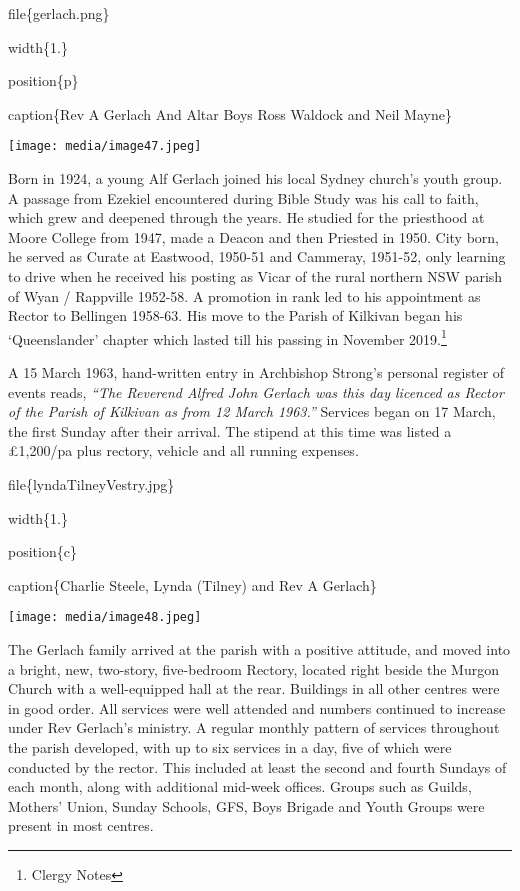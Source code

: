 file\{gerlach.png\}

width\{1.\}

position\{p\}

caption\{Rev A Gerlach And Altar Boys Ross Waldock and Neil Mayne\}

\texttt{[image: media/image47.jpeg]}

Born in 1924, a young Alf Gerlach joined his local Sydney church's youth group. A passage from Ezekiel encountered during Bible Study was his call to faith, which grew and deepened through the years. He studied for the priesthood at Moore College from 1947, made a Deacon and then Priested in 1950. City born, he served as Curate at Eastwood, 1950-51 and Cammeray, 1951-52, only learning to drive when he received his posting as Vicar of the rural northern NSW parish of Wyan / Rappville 1952-58. A promotion in rank led to his appointment as Rector to Bellingen 1958-63. His move to the Parish of Kilkivan began his `Queenslander' chapter which lasted till his passing in November 2019.\footnote{Clergy Notes}

A 15 March 1963, hand-written entry in Archbishop Strong's personal register of events reads, \emph{``The Reverend Alfred John Gerlach was this day licenced as Rector of the Parish of Kilkivan as from 12 March 1963.''} Services began on 17 March, the first Sunday after their arrival. The stipend at this time was listed a £1,200/pa plus rectory, vehicle and all running expenses.

file\{lyndaTilneyVestry.jpg\}

width\{1.\}

position\{c\}

caption\{Charlie Steele, Lynda (Tilney) and Rev A Gerlach\}

\texttt{[image: media/image48.jpeg]}

The Gerlach family arrived at the parish with a positive attitude, and moved into a bright, new, two-story, five-bedroom Rectory, located right beside the Murgon Church with a well-equipped hall at the rear. Buildings in all other centres were in good order. All services were well attended and numbers continued to increase under Rev Gerlach's ministry. A regular monthly pattern of services throughout the parish developed, with up to six services in a day, five of which were conducted by the rector. This included at least the second and fourth Sundays of each month, along with additional mid-week offices. Groups such as Guilds, Mothers' Union, Sunday Schools, GFS, Boys Brigade and Youth Groups were present in most centres.

